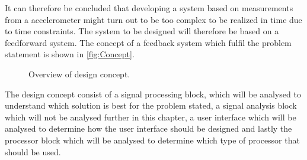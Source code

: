 It can therefore be concluded that developing a system based on measurements from a accelerometer might turn out to be too complex to be realized in time due to time constraints. The system to be designed will therefore be based on a feedforward system. The concept of a feedback system which fulfil the problem statement is shown in \autoref{fig:Concept}.

\begin{figure}[H]
\centering
{}
\scalebox{0.8}{
}
\caption{Overview of design concept.}
\label{fig:Concept}
\end{figure}

The design concept consist of a signal processing block, which will be analysed to understand which solution is best for the problem stated, a signal analysis block which will not be analysed further in this chapter, a user interface which will be analysed to determine how the user interface should be designed and lastly the processor block which will be analysed to determine which type of processor that should be used. 